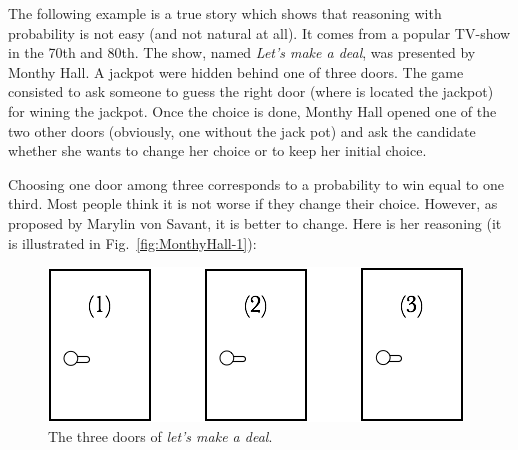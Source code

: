 The following example is a true story which shows that reasoning with probability is not easy (and not natural at all). 
It comes from a popular TV-show in the 70th and 80th. 
The show, named \textit{Let's make a deal}, was presented by  Monthy Hall.
A jackpot were hidden behind one of three doors. 
The game consisted to ask someone to guess the right door (where is located the jackpot)
for wining the jackpot.
Once the choice is done, Monthy Hall opened one of the two other doors (obviously, one without the jack pot)
and ask the candidate whether she wants to change her choice or to keep her initial choice.

Choosing one door among three corresponds to a probability to win equal to one third.
Most people think it is not worse if they change their choice.
However, as proposed by Marylin von Savant, it is better to change. 
Here is her reasoning
(it is illustrated in Fig.~\ref{fig:MonthyHall-1}):
\begin{figure}[h]
\begin{center}
        \includegraphics[scale=0.5]{FiguresMaths/MonthyHallInitial}
        \caption{The three doors of \textit{let's make a deal}.}
        \label{fig:MonthyHal-1}
\end{center}
\end{figure}

